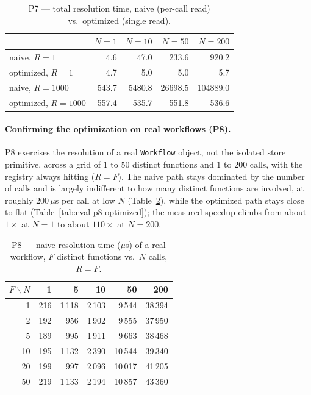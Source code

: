 \begin{table}[htbp]
  \centering
  \caption{P7 --- total resolution time, naive (per-call read) vs.\ optimized (single read).}
  \label{tab:eval-p7}
  \begin{tabular}{lrrrr}
    \hline
     & $N{=}1$ & $N{=}10$ & $N{=}50$ & $N{=}200$ \\
    \hline
    naive, $R{=}1$       & 4.6   & 47.0   & 233.6   & 920.2    \\
    optimized, $R{=}1$   & 4.7   & 5.0    & 5.0     & 5.7      \\
    naive, $R{=}1000$    & 543.7 & 5480.8 & 26698.5 & 104889.0 \\
    optimized, $R{=}1000$& 557.4 & 535.7  & 551.8   & 536.6    \\
    \hline
  \end{tabular}
\end{table}

\paragraph{Confirming the optimization on real workflows (P8).}
P8 exercises the resolution of a real \texttt{Workflow} object, not the isolated store primitive,
across a grid of $1$ to $50$ distinct functions and $1$ to $200$ calls, with the registry always
hitting ($R{=}F$). The naive path stays dominated by the number of calls and is largely
indifferent to how many distinct functions are involved, at roughly $200\,\mu$s per call at low
$N$ (Table~\ref{tab:eval-p8-naive}), while the optimized path stays close to flat
(Table~\ref{tab:eval-p8-optimized}); the measured speedup climbs from about $1\times$ at $N{=}1$
to about $110\times$ at $N{=}200$.

\begin{table}[htbp]
  \centering
  \caption{P8 --- naive resolution time ($\mu$s) of a real workflow, $F$ distinct functions vs.\
  $N$ calls, $R{=}F$.}
  \label{tab:eval-p8-naive}
  \begin{tabular}{rrrrrr}
    \hline
    $F\backslash N$ & 1 & 5 & 10 & 50 & 200 \\
    \hline
    1  & 216 & 1\,118 & 2\,103 & 9\,544  & 38\,394 \\
    2  & 192 & 956    & 1\,902 & 9\,555  & 37\,950 \\
    5  & 189 & 995    & 1\,911 & 9\,663  & 38\,468 \\
    10 & 195 & 1\,132 & 2\,390 & 10\,544 & 39\,340 \\
    20 & 199 & 997    & 2\,096 & 10\,017 & 41\,205 \\
    50 & 219 & 1\,133 & 2\,194 & 10\,857 & 43\,360 \\
    \hline
  \end{tabular}
\end{table}

